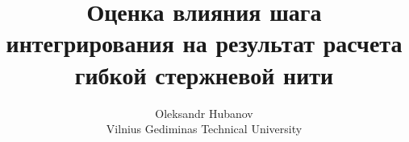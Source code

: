 \documentclass[11pt, oneside, a4paper]{article}
\begin{document}
\title{Оценка влияния шага интегрирования на результат расчета гибкой стержневой нити}
\author{Oleksandr Hubanov\\
Vilnius Gediminas Technical University}
\maketitle






\printbibliography[title=List of literature]
\end{document}
